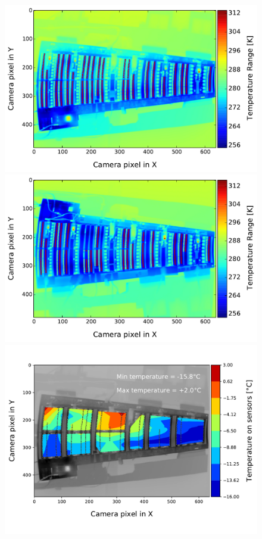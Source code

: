 		\begin{figure}[ht!]
			\centering
			\captionsetup{justification=centering,margin=2cm}
			\includegraphics[scale=0.39]{Figures/Chapter04/thermo_Temp_20170803154926.pdf}
			\includegraphics[scale=0.39]{Figures/Chapter04/thermo_Temp_201708101118_avg.pdf}
			\includegraphics[scale=0.39]{Figures/Chapter04/thermogram_markers_2_201711271001.pdf}

\end{figure}

